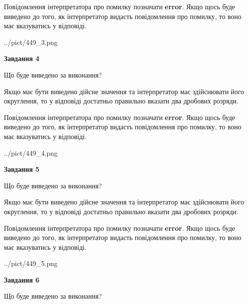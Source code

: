\documentclass[12pt, ukrainian]{article}
\begin{document}
{\begin {Large}
Повідомлення інтерпретатора про помилку позначати \textbf{error}.
Якщо щось буде виведено до того, як інтерпретатор видасть повідомлення про помилку, 
то воно має вказуватись у відповіді. \par

\begin{center}
	{../pict/449_3.png}
\end{center}
\newpage

{\begin {center}\textbf{Завдання 4}\end {center}}\par
Що буде виведено за виконання? \par

Якщо має бути виведено дійсне значення та інтерпретатор має здійснювати його округлення, 
то у відповіді достатньо правильно вказати два дробових розряди.

Повідомлення інтерпретатора про помилку позначати \textbf{error}.
Якщо щось буде виведено до того, як інтерпретатор видасть повідомлення про помилку, 
то воно має вказуватись у відповіді. \par

\begin{center}
	{../pict/449_4.png}
\end{center}
\newpage

{\begin {center}\textbf{Завдання 5}\end {center}}\par
Що буде виведено за виконання? \par

Якщо має бути виведено дійсне значення та інтерпретатор має здійснювати його округлення, 
то у відповіді достатньо правильно вказати два дробових розряди.

Повідомлення інтерпретатора про помилку позначати \textbf{error}.
Якщо щось буде виведено до того, як інтерпретатор видасть повідомлення про помилку, 
то воно має вказуватись у відповіді. \par

\begin{center}
	{../pict/449_5.png}
\end{center}
\newpage

{\begin {center}\textbf{Завдання 6}\end {center}}\par
Що буде виведено за виконання? \par


\end{Large}}
\end{document}
